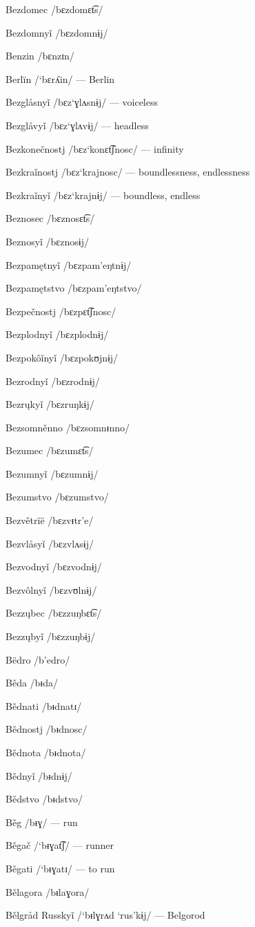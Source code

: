 Bezdomec /bɛzdomɛt͡s/

Bezdomnyǐ /bɛzdomnɨj/

Benzin /bɛnzɪn/

Berlïn /`bɛrʎin/ — Berlin

Bezglåsnyǐ /bɛz`ɣlʌsnɨj/ — voiceless

Bezglåvyǐ /bɛz`ɣlʌvɨj/ — headless

Bezkonečnostj /bɛz`konɛt͡ʃnosc/ — infinity

Bezkraǐnostj /bɛz`krajnosc/ — boundlessness, endlessness

Bezkraǐnyǐ /bɛz`krajnɨj/ — boundless, endless

Beznosec /bɛznosɛt͡s/

Beznosyǐ /bɛznosɨj/

Bezpamętnyǐ /bɛzpam’eŋtnɨj/

Bezpamętstvo /bɛzpam’eŋtstvo/

Bezpečnostj /bɛzpɛt͡ʃnosc/

Bezplodnyǐ /bɛzplodnɨj/

Bezpokôǐnyǐ /bɛzpokʊjnɨj/

Bezrodnyǐ /bɛzrodnɨj/

Bezrųkyǐ /bɛzruŋkɨj/

Bezsomněnno /bɛzsomnᵻnno/

Bezumec /bɛzumɛt͡s/

Bezumnyǐ /bɛzumnɨj/

Bezumstvo /bɛzumstvo/

Bezvětrïë /bɛzvᵻtr’e/

Bezvlåsyǐ /bɛzvlʌsɨj/

Bezvodnyǐ /bɛzvodnɨj/

Bezvôlnyǐ /bɛzvʊlnɨj/

Bezzųbec /bɛzzuŋbɛt͡s/

Bezzųbyǐ /bɛzzuŋbɨj/

Bëdro /b’edro/

Běda /bᵻda/

Bědnati /bᵻdnatɪ/

Bědnostj /bᵻdnosc/

Bědnota /bᵻdnota/

Bědnyǐ /bᵻdnɨj/

Bědstvo /bᵻdstvo/

Běg /bᵻɣ/ — run

Běgač /`bᵻɣat͡ʃ/ — runner

Běgati /`bᵻɣatɪ/ — to run

Bělagora /bᵻlaɣora/

Bělgråd Russkyǐ /`bᵻlɣrʌd `rus’kɨj/ — Belgorod


